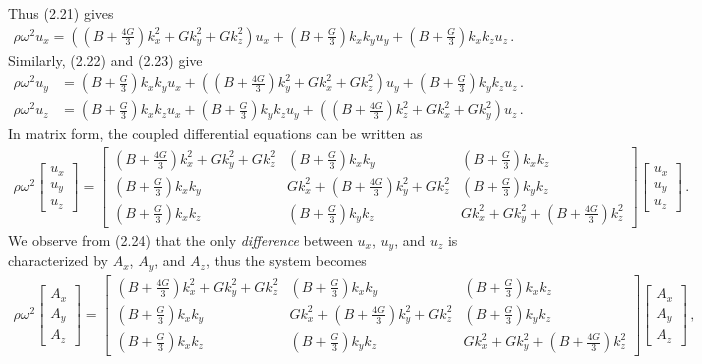 \documentclass[11pt, onesided]{book}
\theoremstyle{break}
\theoremstyle{break}
\newcommand{\bmat}[1]{\begin{bmatrix} #1 \end{bmatrix}}
\begin{document}
Thus (2.21) gives
\begin{align*}
\rho \omega^2u_x = 
\left(\left(B+\frac{4G}{3}\right) k_x^2 + Gk_y^2 + Gk_z^2\right) u_x 
+\left(B+ \frac{G}{3}\right) k_xk_yu_y
+\left(B+\frac{G}{3}\right)k_xk_zu_z\,.
\end{align*}
Similarly, (2.22) and (2.23) give
\begin{align*}
\rho \omega^2 u_y &= \left(B + \frac{G}{3}\right) k_xk_yu_x + \left( \left(B + \frac{4G}{3}\right) k_y^2 + Gk_x^2 +Gk_z^2\right) u_y + \left(B + \frac{G}{3}\right) k_yk_zu_z\,.\\
\rho \omega^2 u_z &= \left(B + \frac{G}{3}\right) k_xk_zu_x + \left( B + \frac{G}{3}\right) k_y k_zu_y + \left( \left( B + \frac{4G}{3}\right)k_z^2 + Gk_x^2 + Gk_y^2\right)u_z\,. 
\end{align*}
In matrix form, the coupled differential equations can be written as
\begin{align*}
\rho \omega^2 \bmat{u_x \\ u_y \\ u_z} = \bmat{
\left(B + \frac{4G}{3}\right) k_x^2+Gk_y^2 + Gk_z^2 & \left(B+\frac{G}{3}\right)k_xk_y & \left(B+\frac{G}{3}\right)k_xk_z\\
\left(B+\frac{G}{3}\right)k_xk_y & Gk_x^2 + \left(B+\frac{4G}{3}\right)k_y^2 + Gk_z^2 & \left(B+\frac{G}{3}\right)k_yk_z\\
\left(B+\frac{G}{3}\right)k_xk_z & \left(B+\frac{G}{3}\right)k_yk_z & Gk_x^2+Gk_y^2+\left(B+\frac{4G}{3}\right) k_z^2
}
\bmat{u_x\\ u_y \\ u_z}\,.
\end{align*}
We observe from (2.24) that the only \textit{difference} between $u_x$, $u_y$, and $u_z$ is characterized by $A_x$, $A_y$, and $A_z$, thus the system becomes
\begin{align*}
\rho \omega^2 \bmat{A_x \\ A_y \\ A_z} = \bmat{
\left(B + \frac{4G}{3}\right) k_x^2+Gk_y^2 + Gk_z^2 & \left(B+\frac{G}{3}\right)k_xk_y & \left(B+\frac{G}{3}\right)k_xk_z\\
\left(B+\frac{G}{3}\right)k_xk_y & Gk_x^2 + \left(B+\frac{4G}{3}\right)k_y^2 + Gk_z^2 & \left(B+\frac{G}{3}\right)k_yk_z\\
\left(B+\frac{G}{3}\right)k_xk_z & \left(B+\frac{G}{3}\right)k_yk_z & Gk_x^2+Gk_y^2+\left(B+\frac{4G}{3}\right) k_z^2
}
\bmat{A_x\\ A_y \\ A_z}\,,
\end{align*}
\end{document}
